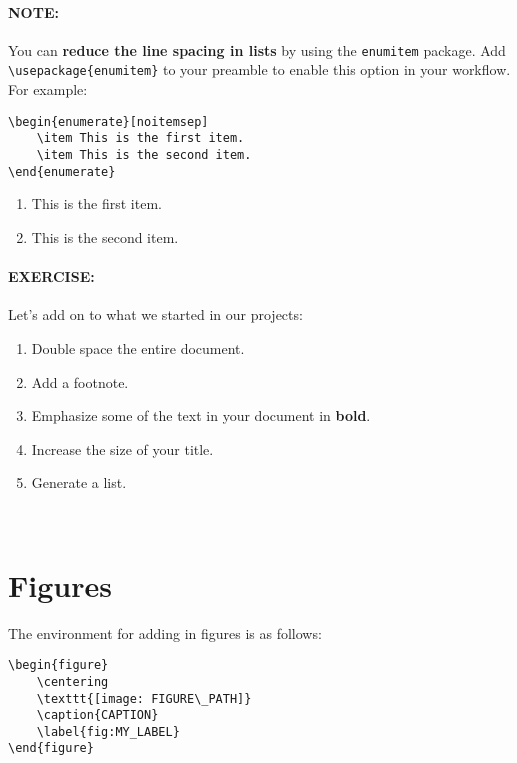 \documentclass[11pt]{article}
\begin{document}
\paragraph{NOTE:} You can \textbf{reduce the line spacing in lists} by using the \verb|enumitem| package. Add \verb|\usepackage{enumitem}| to your preamble to enable this option in your workflow. For example:

\begin{lstlisting}
\begin{enumerate}[noitemsep]
    \item This is the first item.
    \item This is the second item.
\end{enumerate}
\end{lstlisting}

\begin{enumerate}[noitemsep]
    \item This is the first item.
    \item This is the second item.
\end{enumerate}
\vspace{1.5em}
\hline
\paragraph{EXERCISE:} Let's add on to what we started in our projects:

\begin{enumerate}[noitemsep]
    \item Double space the entire document.
    \item Add a footnote.
    \item Emphasize some of the text in your document in \textbf{bold}.
    \item Increase the size of your title.
    \item Generate a list.
\end{enumerate}
\\\vspace{0.5em}
\hline


\section*{Figures}

The environment for adding in figures is as follows:

\begin{lstlisting}
\begin{figure}
    \centering
    \texttt{[image: FIGURE\_PATH]}
    \caption{CAPTION}
    \label{fig:MY_LABEL}
\end{figure}
\end{lstlisting}
\end{document}

